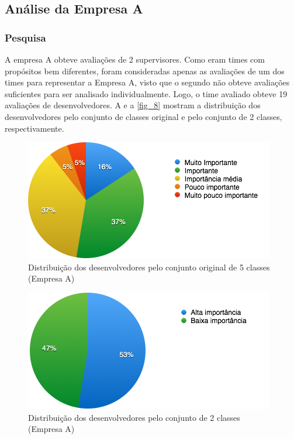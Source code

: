 \subsection{Análise da Empresa A}

\subsubsection{Pesquisa}

A empresa A obteve avaliações de 2 supervisores. Como eram times com propósitos bem diferentes, foram consideradas apenas as avaliações de um dos times para representar a Empresa A, visto que o segundo não obteve avaliações suficientes para ser analisado individualmente. Logo, o time avaliado obteve 19 avaliações de desenvolvedores. A  e a \autoref{fig_8} mostram a distribuição dos desenvolvedores pelo conjunto de classes original e pelo conjunto de 2 classes, respectivamente.


\begin{figure}[h]
	\centering
	\includegraphics[scale=0.8]{figs/empresa_a/imagem-classe-original.png}
	\caption{\label{fig_7}Distribuição dos desenvolvedores pelo conjunto original de 5 classes (Empresa A)}
\end{figure}

\begin{figure}[h]
	\centering
	\includegraphics[scale=0.8]{figs/empresa_a/imagem-classe-alternativa.png}
	\caption{\label{fig_8}Distribuição dos desenvolvedores pelo conjunto de 2 classes (Empresa A)}
\end{figure}

